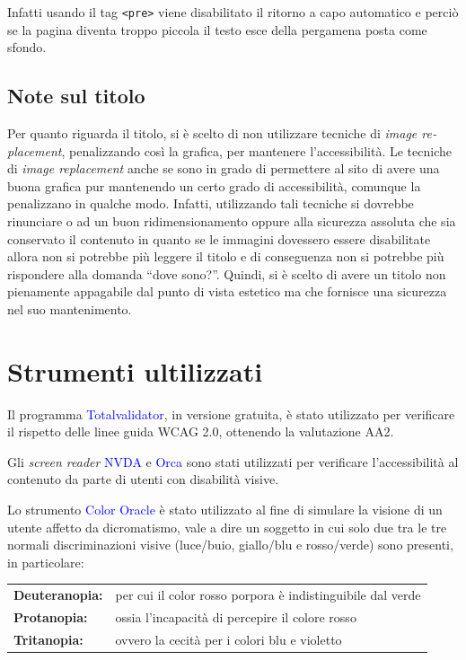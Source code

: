 \documentclass[10pt,a4paper,onecolumn]{article}
\newcommand{\inglese}[1]{\foreignlanguage{english}{\itshape{}#1}}
\newcommand{\progname}[1]{\textcolor{blue}{\textsf{#1}}}
\begin{document}
Infatti usando il tag \texttt{<pre>} viene disabilitato il ritorno a capo automatico e perciò se la pagina diventa troppo piccola il testo esce della pergamena posta come sfondo.

\subsection{Note sul titolo}

Per quanto riguarda il titolo, si è scelto di non utilizzare tecniche di \inglese{image replacement}, penalizzando così la grafica, per mantenere l'accessibilità. Le tecniche di \inglese{image replacement} anche se sono in grado di permettere al sito di avere una buona grafica pur mantenendo un certo grado di accessibilità, comunque la penalizzano in qualche modo. Infatti, utilizzando tali tecniche si dovrebbe rinunciare o ad un buon ridimensionamento oppure alla sicurezza assoluta che sia conservato il contenuto in quanto se le immagini dovessero essere disabilitate allora non si potrebbe più leggere il titolo e di conseguenza non si potrebbe più rispondere alla domanda ``dove sono?''. Quindi, si è scelto di avere un titolo non pienamente appagabile dal punto di vista estetico ma che fornisce una sicurezza nel suo mantenimento.

\section{Strumenti ultilizzati}\label{sec:strumenti}

Il programma \progname{Totalvalidator}, in versione gratuita, è stato utilizzato per verificare il rispetto delle linee guida WCAG 2.0, ottenendo la valutazione AA2.


Gli \inglese{screen reader}  \progname{	NVDA} e  \progname{Orca} sono stati utilizzati per verificare l'accessibilità al contenuto da parte di utenti con disabilità visive.

Lo strumento \progname{Color Oracle} è stato utilizzato al fine di simulare la visione di un utente affetto da dicromatismo, vale a dire un soggetto in cui solo due tra le tre normali discriminazioni visive (luce/buio, giallo/blu e rosso/verde) sono presenti, in particolare:

\begin{tabular}{>{\sffamily\bfseries}lp{}}
  Deuteranopia: & per cui il color rosso porpora è indistinguibile dal verde\\
  Protanopia: & ossia l'incapacità di percepire il colore rosso\\
  Tritanopia: & ovvero la cecità per i colori blu e violetto\\
\end{tabular}
\end{document}
